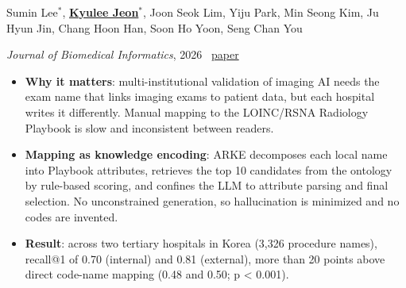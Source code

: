 \documentclass[9pt,letterpaper]{extarticle}
\newcommand{\mes}{\underline{\textbf{Kyulee Jeon}$^*$}}
\begin{document}
Sumin Lee$^*$, \mes, Joon Seok Lim, Yiju Park, Min Seong Kim, Ju Hyun Jin, Chang Hoon Han, Soon Ho Yoon, Seng Chan You\par
\textit{Journal of Biomedical Informatics}, 2026 \ \href{https://doi.org/10.1016/j.jbi.2026.105071}{paper}
\begin{itemize}
\item \textbf{Why it matters}: multi-institutional validation of imaging AI needs the exam name that links imaging exams to patient data, but each hospital writes it differently. Manual mapping to the LOINC/RSNA Radiology Playbook is slow and inconsistent between readers.
\item \textbf{Mapping as knowledge encoding}: ARKE decomposes each local name into Playbook attributes, retrieves the top 10 candidates from the ontology by rule-based scoring, and confines the LLM to attribute parsing and final selection. No unconstrained generation, so hallucination is minimized and no codes are invented.
\item \textbf{Result}: across two tertiary hospitals in Korea (3,326 procedure names), recall@1 of 0.70 (internal) and 0.81 (external), more than 20 points above direct code-name mapping (0.48 and 0.50; p < 0.001).
\end{itemize}
\end{document}
